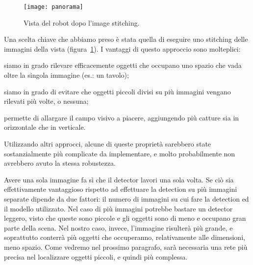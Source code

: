 \begin{figure}
	\centering
	\texttt{[image: panorama]}
	\caption{Vista del robot dopo l'image stitching.}\label{fig:panorama}
\end{figure}

Una scelta chiave che abbiamo preso è stata quella di eseguire uno stitching delle immagini della vista (figura~\ref{fig:panorama}). I vantaggi di questo approccio sono molteplici: \begin{enumerate*}[label={(\arabic*)}] \item siamo in grado rilevare efficacemente oggetti che occupano uno spazio che vada oltre la singola immagine (es.\@: un tavolo); \item siamo in grado di evitare che oggetti piccoli divisi su più immagini vengano rilevati più volte, o nessuna; \item permette di allargare il campo visivo a piacere, aggiungendo più catture sia in orizzontale che in verticale.\end{enumerate*} Utilizzando altri approcci, alcune di queste proprietà sarebbero state sostanzialmente più complicate da implementare, e molto probabilmente non avrebbero avuto la stessa robustezza.

\label{sec:master_small_img}Avere una sola immagine fa sì che il detector lavori una sola volta. Se ciò sia effettivamente vantaggioso rispetto ad effettuare la detection su più immagini separate dipende da due fattori: il numero di immagini su cui fare la detection ed il modello utilizzato. Nel caso di più immagini potrebbe bastare un detector leggero, visto che queste sono piccole e gli oggetti sono di meno e occupano gran parte della scena. Nel nostro caso, invece, l'immagine risulterà più grande, e soprattutto conterrà più oggetti che occuperanno, relativamente alle dimensioni, meno spazio. Come vedremo nel prossimo paragrafo, sarà necessaria una rete più precisa nel localizzare oggetti piccoli, e quindi più complessa.